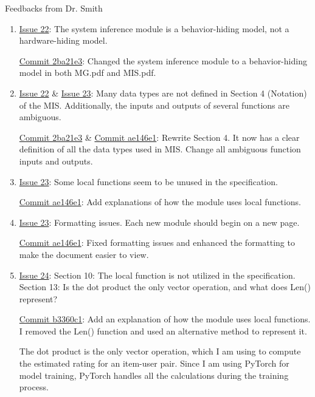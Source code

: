\documentclass{article}
\begin{document}
Feedbacks from Dr. Smith
\begin{enumerate}
    \item \href{https://github.com/V-AS/Two-tower-recommender-system/issues/22}{Issue 22}: The system inference module is a behavior-hiding model, not a hardware-hiding model.
    
    \href{https://github.com/V-AS/Two-tower-recommender-system/commit/2ba21e3990ce2f0be6d8195ed314264c62737fde}{Commit 2ba21e3}: Changed the system inference module to a behavior-hiding model in both MG.pdf and MIS.pdf.

    \item \href{https://github.com/V-AS/Two-tower-recommender-system/issues/22}{Issue 22} \& \href{https://github.com/V-AS/Two-tower-recommender-system/issues/23}{Issue 23}: Many data types are not defined in Section 4 (Notation) of the MIS. Additionally, the inputs and outputs of several functions are ambiguous.
    
    \href{https://github.com/V-AS/Two-tower-recommender-system/commit/2ba21e3990ce2f0be6d8195ed314264c62737fde}{Commit 2ba21e3} \& \href{https://github.com/V-AS/Two-tower-recommender-system/commit/ae146e1d1d0a29160bcef0dcfc530141b75d0cae}{Commit ae146e1}: Rewrite Section 4. It now has a clear definition of all the data types used in MIS. Change all ambiguous function inputs and outputs.

    \item \href{https://github.com/V-AS/Two-tower-recommender-system/issues/23}{Issue 23}: Some local functions seem to be unused in the specification.
    
    \href{https://github.com/V-AS/Two-tower-recommender-system/commit/ae146e1d1d0a29160bcef0dcfc530141b75d0cae}{Commit ae146e1}: Add explanations of how the module uses local functions.
    \item \href{https://github.com/V-AS/Two-tower-recommender-system/issues/23}{Issue 23}: Formatting issues. Each new module should begin on a new page.

    \href{https://github.com/V-AS/Two-tower-recommender-system/commit/ae146e1d1d0a29160bcef0dcfc530141b75d0cae}{Commit ae146e1}: Fixed formatting issues and enhanced the formatting to make the document easier to view.

    \item \href{https://github.com/V-AS/Two-tower-recommender-system/issues/24}{Issue 24}: Section 10: The local function is not utilized in the specification. Section 13: Is the dot product the only vector operation, and what does Len() represent?

    \href{https://github.com/V-AS/Two-tower-recommender-system/commit/b3360c18fbc69895e2156de6beeffb04c890721e}{Commit b3360c1}: Add an explanation of how the module uses local functions. I removed the Len() function and used an alternative method to represent it.
    
    The dot product is the only vector operation, which I am using to compute the estimated rating for an item-user pair. Since I am using PyTorch for model training, PyTorch handles all the calculations during the training process.


\end{enumerate}
\end{document}
